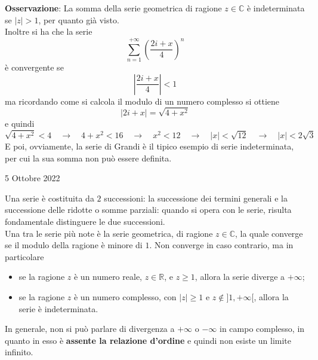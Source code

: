\documentclass[a4paper]{extarticle}
\begin{document}
\vspace{1em}
\noindent
\textbf{Osservazione}: La somma della serie geometrica di ragione $z \in \mathbb{C}$ è indeterminata se $\vert z \vert > 1$, per quanto già visto.\\
Inoltre si ha che la serie
\[\sum_{n=1}^{+\infty} \left(\frac{2i + x}{4}\right)^n\]
è convergente se
\[\left \vert \frac{2i + x}{4}\right \vert < 1\]
ma ricordando come si calcola il modulo di un numero complesso si ottiene
\[\left \vert 2i + x \right \vert = \sqrt{4+x^2}\]
e quindi 
\[\sqrt{4+x^2} < 4 \hspace{1em} \rightarrow \hspace{1em} 4 + x^2 < 16 \hspace{1em} \rightarrow \hspace{1em} x^2 < 12 \hspace{1em} \rightarrow \hspace{1em} \vert x \vert < \sqrt{12} \hspace{1em} \rightarrow \hspace{1em} \vert x \vert < 2 \sqrt{3}\]
E poi, ovviamente, la serie di Grandi è il tipico esempio di serie indeterminata, per cui la sua somma non può essere definita.

\newpage
\noindent
\begin{center}
    5 Ottobre 2022
\end{center}
Una serie è costituita da $2$ successioni: la successione dei termini generali e la successione delle ridotte o somme parziali: quando si opera con le serie, risulta fondamentale distinguere le due successioni.\\
Una tra le serie più note è la serie geometrica, di ragione $z \in \mathbb{C}$, la quale converge se il modulo della ragione è minore di $1$. Non converge in caso contrario, ma in particolare
\begin{itemize}
    \item se la ragione $z$ è un numero reale, $z \in \mathbb{R}$, e $z \geq 1$, allora la serie diverge a $+\infty$;
    \item se la ragione $z$ è un numero complesso, con $\vert z \vert \geq 1$ e $z \notin ]1,+\infty[$, allora la serie è indeterminata.
\end{itemize} 
In generale, non si può parlare di divergenza a $+\infty$ o $-\infty$ in campo complesso, in quanto in esso è \textbf{assente la relazione d'ordine} e quindi non esiste un limite infinito.
\end{document}
